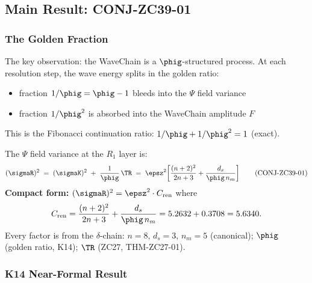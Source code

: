 \documentclass[12pt, a4paper]{article}
\begin{document}
\subsection{Main Result: CONJ-ZC39-01}
\label{sec:main}

\subsubsection{The Golden Fraction}

The key observation: the WaveChain is a $\phig$-structured process.
At each resolution step, the wave energy splits in the golden ratio:
\begin{itemize}[noitemsep,leftmargin=2em]
  \item fraction $1/\phig = \phig - 1$ bleeds into the $\Psi$ field variance
  \item fraction $1/\phig^2$ is absorbed into the WaveChain amplitude $F$
\end{itemize}
This is the Fibonacci continuation ratio: $1/\phig + 1/\phig^2 = 1$ (exact).

\begin{derivedbox}[title={CONJ-ZC39-01: Renormalized $\Psi$ Variance}]
The $\Psi$ field variance at the $R_1$ layer is:
\[
  (\sigmaR)^2
  \;=\; (\sigmaK)^2 \;+\; \frac{1}{\phig}\,\TR
  \;=\; \epsz^2\!\left[\frac{(n+2)^2}{2n+3} + \frac{d_s}{\phig\,n_m}\right]
  \tag{CONJ-ZC39-01}
\]
\textbf{Compact form:}
$(\sigmaR)^2 = \epsz^2 \cdot C_{\rm ren}$
where
\[
  C_{\rm ren} = \frac{(n+2)^2}{2n+3} + \frac{d_s}{\phig\,n_m}
  = 5.2632 + 0.3708 = 5.6340.
\]
Every factor is from the $\delta$-chain:
$n=8$, $d_s=3$, $n_m=5$ (canonical); $\phig$ (golden ratio, K14);
$\TR$ (ZC27, THM-ZC27-01).
\end{derivedbox}

\subsubsection{K14 Near-Formal Result}
\end{document}
